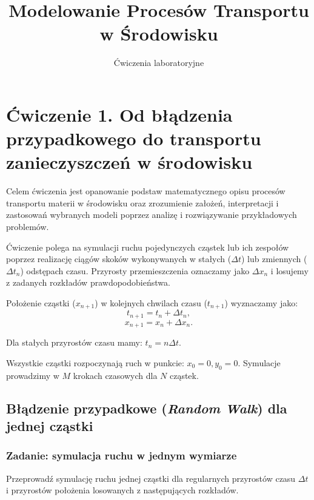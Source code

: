 \documentclass[
  polish,
  letterpaper,
  DIV=11,
  numbers=noendperiod]{scrartcl}
\title{Modelowanie Procesów Transportu w Środowisku}
\subtitle{Ćwiczenia laboratoryjne}
\author{}
\date{}
\begin{document}
\maketitle


\section{Ćwiczenie 1. Od błądzenia przypadkowego do transportu
zanieczyszczeń w
środowisku}\label{ux107wiczenie-1.-od-bux142ux105dzenia-przypadkowego-do-transportu-zanieczyszczeux144-w-ux15brodowisku}

Celem ćwiczenia jest opanowanie podstaw matematycznego opisu procesów
transportu materii w środowisku oraz zrozumienie założeń, interpretacji
i zastosowań wybranych modeli poprzez analizę i rozwiązywanie
przykładowych problemów.

Ćwiczenie polega na symulacji ruchu pojedynczych cząstek lub ich
zespołów poprzez realizację ciągów skoków wykonywanych w stałych
(\(\Delta t\)) lub zmiennych (\(\Delta t_n\)) odstępach czasu. Przyrosty
przemieszczenia oznaczamy jako \(\Delta x_n\) i losujemy z zadanych
rozkładów prawdopodobieństwa.

Położenie cząstki (\(x_{n+1}\)) w kolejnych chwilach czasu (\(t_{n+1}\))
wyznaczamy jako: \[ t_{n+1}=t_n+\Delta t_n,\]
\[x_{n+1}=x_n+\Delta x_n.\]

Dla stałych przyrostów czasu mamy: \(t_n=n\Delta t.\)

Wszystkie cząstki rozpoczynają ruch w punkcie: \(x_0=0, y_0=0\).
Symulacje prowadzimy w \(M\) krokach czasowych dla \(N\) cząstek.

\subsection{\texorpdfstring{Błądzenie przypadkowe (\emph{Random Walk})
dla jednej
cząstki}{Błądzenie przypadkowe (Random Walk) dla jednej cząstki}}\label{bux142ux105dzenie-przypadkowe-random-walk-dla-jednej-czux105stki}

\subsubsection{Zadanie: symulacja ruchu w jednym
wymiarze}\label{zadanie-symulacja-ruchu-w-jednym-wymiarze}

Przeprowadź symulację ruchu jednej cząstki dla regularnych przyrostów
czasu \(\Delta t\) i przyrostów położenia losowanych z następujących
rozkładów.
\end{document}

